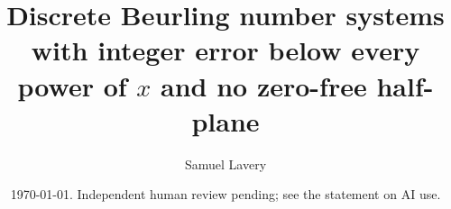 \documentclass[11pt]{amsart}
\title[Beurling systems with $N(x)=x+O(x^{\varepsilon})$ and no zero-free half-plane]{Discrete Beurling number systems with integer error below every power of $x$ and no zero-free half-plane}
\author{Samuel Lavery}
\date{\today. Independent human review pending; see the statement on AI use.}
\theoremstyle{plain}
\theoremstyle{definition}
\theoremstyle{remark}
\begin{document}
\begin{abstract}

\end{abstract}
\maketitle
\setcounter{tocdepth}{2}
\tableofcontents









\appendix




\nocite{BDR}


\end{document}
